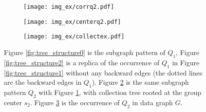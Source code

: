 \begin{figure}[t!]
	\vspace{-2mm}
	\centering
	\eat
	{
	}
	\captionsetup[subfigure]{skip=5pt}
	\begin{subfigure}[b]{0.2\textwidth}
		\texttt{[image: img\_ex/corrq2.pdf]}
		\caption{}
		\label{fig:tree_structure3}
	\end{subfigure}%
	\begin{subfigure}[b]{0.25\textwidth}
		\texttt{[image: img\_ex/centerq2.pdf]}
		\caption{}
		\label{fig:tree_structure4}
	\end{subfigure}
	\begin{subfigure}[b]{0.5\textwidth}
		\texttt{[image: img\_ex/collectex.pdf]}
		\caption{}
		\label{fig:tree_structure5}
	\end{subfigure}
	\vspace{-8mm}
	\caption{\scriptsize Figure \ref{fig:tree_structure0} is the subgraph pattern of $Q_1$, Figure \ref{fig:tree_structure2} is a replica of the occurrence of $Q_1$ in Figure \ref{fig:tree_structure1} without any backward edges (the dotted lines are the backward edges in $Q_1$). Figure \ref{fig:tree_structure4} is the same subgraph pattern $Q_2$ with Figure \ref{fig:tree_structure3}, with collection tree rooted at the group center $s_2$. Figure \ref{fig:tree_structure5} is the occurrence of $Q_2$ in data graph $G$.}
	\label{fig:replica}
	\vspace{-5mm}
\end{figure}


